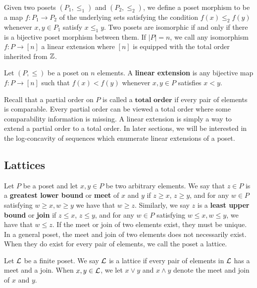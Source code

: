 \documentclass{puthesis-UG}
\begin{document}
Given two posets $(P_1, \leq_1)$ and $(P_2, \leq_2)$, we define a poset morphism to be a map $f : P_1 \to P_2$ of the underlying sets satisfying the condition $f(x) \leq_2 f(y)$ whenever $x, y \in P_1$ satisfy $x \leq_1 y$. Two posets are isomorphic if and only if there is a bijective poset morphism between them. If $|P| = n$, we call any isomorphism $f : P \to [n]$ a linear extension where $[n]$ is equipped with the total order inherited from $\mathbb{Z}$. 

\begin{defn} \label{defn:linear-extension}
	Let $(P, \leq)$ be a poset on $n$ elements. A \textbf{linear extension} is any bijective map $f : P \to [n]$ such that $f(x) < f(y)$ whenever $x, y \in P$ satisfies $x < y$.
\end{defn}

Recall that a partial order on $P$ is called a $\textbf{total order}$ if every pair of elements is comparable. Every partial order can be viewed a total order where some comparability information is missing. A linear extension is simply a way to extend a partial order to a total order. In later sections, we will be interested in the log-concavity of sequences which enumerate linear extensions of a poset.

\subsection{Lattices}

Let $P$ be a poset and let $x, y \in P$ be two arbitrary elements. We say that $z \in P$ is a \textbf{greatest lower bound} or \textbf{meet} of $x$ and $y$ if $z \geq x$, $z \geq y$, and for any $w \in P$ satisfying $w \geq x, w \geq y$ we have that $w \geq z$. Similarly, we say $z$ is a \textbf{least upper bound} or \textbf{join} if $z \leq x$, $z \leq y$, and for any $w \in P$ satisfying $w \leq x, w \leq y$, we have that $w \leq z$. If the meet or join of two elements exist, they must be unique. In a general poset, the meet and join of two elements does not necessarily exist. When they do exist for every pair of elements, we call the poset a lattice. 

\begin{defn} \label{defn:lattice}
	Let $\mathcal{L}$ be a finite poset. We say $\mathcal{L}$ is a lattice if every pair of elements in $\mathcal{L}$ has a meet and a join. When $x, y \in \mathcal{L}$, we let $x \vee y$  and $x \wedge y$ denote the meet and join of $x$ and $y$. 
\end{defn}
\end{document}
